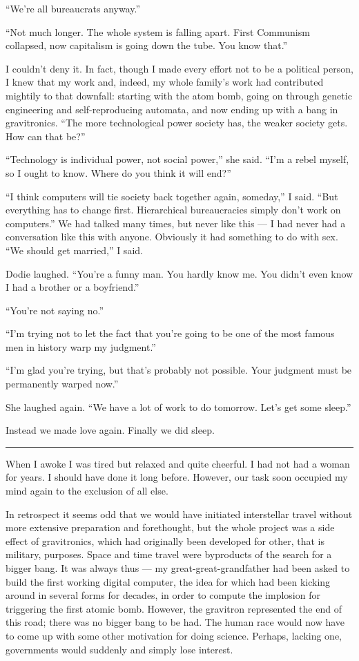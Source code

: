 \documentclass[english,11pt,letterpaper,onecolumn]{scrbook}
\begin{document}
	``We're all bureaucrats anyway.''

	``Not much longer.  The whole system is falling apart.  First Communism collapsed, now capitalism is going down the tube.  You know that.''

	I couldn't deny it.  In fact, though I made every effort not to be a political person, I knew that my work and, indeed, my whole family's work had contributed mightily to that downfall:  starting with the atom bomb, going on through genetic engineering and self-reproducing automata, and now ending up with a bang in gravitronics.  ``The more technological power society has, the weaker society gets.  How can that be?''

	``Technology is individual power, not social power,'' she said.  ``I'm a rebel myself, so I ought to know.  Where do you think it will end?''

	``I think computers will tie society back together again, someday,'' I said.  ``But everything has to change first.  Hierarchical bureaucracies simply don't work on computers.''  We had talked many times, but never like this --- I had never had a conversation like this with anyone.  Obviously it had something to do with sex.  ``We should get married,'' I said.

	Dodie laughed.  ``You're a funny man.  You hardly know me.  You didn't even know I had a brother or a boyfriend.''

	``You're not saying no.''

	``I'm trying not to let the fact that you're going to be one of the most famous men in history warp my judgment.''

	``I'm glad you're trying, but that's probably not possible.  Your judgment must be permanently warped now.''

	She laughed again.  ``We have a lot of work to do tomorrow.  Let's get some sleep.''

	Instead we made love again.  Finally we did sleep.

\begin{center}\rule[3pt]{2in}{0.5pt}\end{center}

	When I awoke I was tired but relaxed and quite cheerful.  I had not had a woman for years.  I should have done it long before.  However, our task soon occupied my mind again to the exclusion of all else.

	In retrospect it seems odd that we would have initiated interstellar travel without more extensive preparation and forethought, but the whole project was a side effect of gravitronics, which had originally been developed for other, that is military, purposes.  Space and time travel were byproducts of the search for a bigger bang.  It was always thus --- my great-great-grandfather had been asked to build the first working digital computer, the idea for which had been kicking around in several forms for decades, in order to compute the implosion for triggering the first atomic bomb.  However, the gravitron represented the end of this road; there was no bigger bang to be had.  The human race would now have to come up with some other motivation for doing science.  Perhaps, lacking one, governments would suddenly and simply lose interest.
\end{document}
